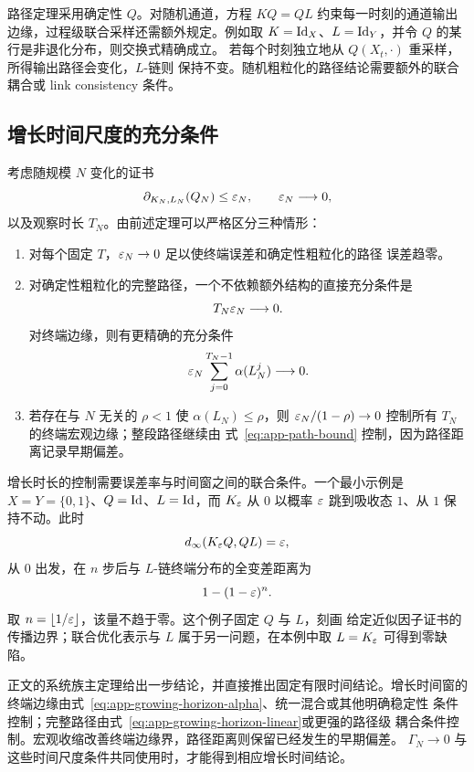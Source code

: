 路径定理采用确定性 $Q$。对随机通道，方程 $KQ=QL$ 约束每一时刻的通道输出
边缘，过程级联合采样还需额外规定。例如取
$K=\operatorname{Id}_X$、$L=\operatorname{Id}_Y$，并令 $Q$ 的某行是非退化分布，则交换式精确成立。
若每个时刻独立地从 $Q(X_t,\cdot)$ 重采样，所得输出路径会变化，$L$-链则
保持不变。随机粗粒化的路径结论需要额外的联合耦合或 link consistency
条件。

\subsection{增长时间尺度的充分条件}

考虑随规模 $N$ 变化的证书
\[
 \partial_{K_N,L_N}(Q_N)\le\varepsilon_N,
 \qquad \varepsilon_N\longrightarrow0,
\]
以及观察时长 $T_N$。由前述定理可以严格区分三种情形：
\begin{enumerate}
 \item 对每个固定 $T$，$\varepsilon_N\to0$ 足以使终端误差和确定性粗粒化的路径
  误差趋零。
 \item 对确定性粗粒化的完整路径，一个不依赖额外结构的直接充分条件是
 \begin{equation}
   T_N\varepsilon_N\longrightarrow0.
   \label{eq:app-growing-horizon-linear}
 \end{equation}
 对终端边缘，则有更精确的充分条件
 \begin{equation}
   \varepsilon_N\sum_{j=0}^{T_N-1}\alpha(L_N^j)\longrightarrow0.
   \label{eq:app-growing-horizon-alpha}
 \end{equation}
 \item 若存在与 $N$ 无关的 $\rho<1$ 使 $\alpha(L_N)\le\rho$，则
 $\varepsilon_N/(1-\rho)\to0$ 控制所有 $T_N$ 的终端宏观边缘；整段路径继续由
 式~\eqref{eq:app-path-bound} 控制，因为路径距离记录早期偏差。
\end{enumerate}

增长时长的控制需要误差率与时间窗之间的联合条件。一个最小示例是
$X=Y=\{0,1\}$、$Q=\operatorname{Id}$、$L=\operatorname{Id}$，而 $K_\varepsilon$ 从 $0$ 以概率
$\varepsilon$ 跳到吸收态 $1$、从 $1$ 保持不动。此时
\[
 d_\infty(K_\varepsilon Q,QL)=\varepsilon,
\]
从 $0$ 出发，在 $n$ 步后与 $L$-链终端分布的全变差距离为
\[
 1-(1-\varepsilon)^n.
\]
取 $n=\lfloor1/\varepsilon\rfloor$，该量不趋于零。这个例子固定 $Q$ 与 $L$，刻画
给定近似因子证书的传播边界；联合优化表示与 $L$ 属于另一问题，在本例中取
$L=K_\varepsilon$ 可得到零缺陷。

正文的系统族主定理给出一步结论，并直接推出固定有限时间结论。增长时间窗的
终端边缘由式~\eqref{eq:app-growing-horizon-alpha}、统一混合或其他明确稳定性
条件控制；完整路径由式~\eqref{eq:app-growing-horizon-linear}或更强的路径级
耦合条件控制。宏观收缩改善终端边缘界，路径距离则保留已经发生的早期偏差。
$\Gamma_N\to0$ 与这些时间尺度条件共同使用时，才能得到相应增长时间结论。
